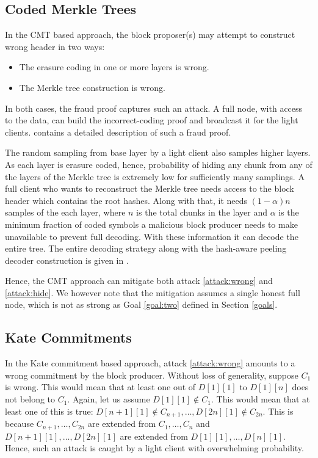 \documentclass[sigconf, screen=true, nonacm]{acmart}
\begin{document}
    \subsection{Coded Merkle Trees}
        In the CMT based approach, the block proposer(s) may attempt to construct wrong header in two ways:
        \begin{itemize}
            \item The erasure coding in one or more layers is wrong. 
            \item The Merkle tree construction is wrong.
        \end{itemize}

        In both cases, the fraud proof captures such an attack. A full node, with access to the data, can build the incorrect-coding proof and broadcast it for the light clients. \cite{yu2019coded} contains a detailed description of such a fraud proof. 

        The random sampling from base layer by a light client also samples higher layers. As each layer is erasure coded, hence, probability of hiding any chunk from any of the layers of the Merkle tree is extremely low for sufficiently many samplings. A full client who wants to reconstruct the Merkle tree needs access to the block header which contains the root hashes. Along with that, it needs $(1-\alpha)n$ samples of the each layer, where $n$ is the total chunks in the layer and $\alpha$ is the minimum fraction of coded symbols a malicious block producer needs to make unavailable to prevent full decoding. With these information it can decode the entire tree. The entire decoding strategy along with the hash-aware peeling decoder construction is given in \cite{yu2019coded}. 

        Hence, the CMT approach can mitigate both attack \ref{attack:wrong} and \ref{attack:hide}.  We however note that the mitigation assumes a single honest full node, which is not as strong as Goal \ref{goal:two} defined in Section \ref{goals}. 

    \subsection{Kate Commitments}
        In the Kate commitment based approach, attack \ref{attack:wrong} amounts to a wrong commitment by the block producer. Without loss of generality, suppose $C_1$ is wrong. This would mean that at least one out of $D[1][1]$ to $D[1][n]$ does not belong to $C_1$. Again, let us assume $D[1][1] \not\in C_1$. This would mean that at least one of this is true: $D[n+1][1] \not\in C_{n+1}, \dots, D[2n][1] \not\in C_{2n}$. This is because $C_{n+1}, \dots, C_{2n}$ are extended from $C_1, \dots, C_n$ and $D[n+1][1], \dots, D[2n][1]$ are extended from $D[1][1], \dots, D[n][1]$. Hence, such an attack is caught by a light client with overwhelming probability. 
\end{document}
